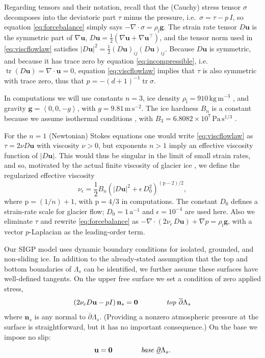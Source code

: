 \documentclass[letterpaper,final,12pt,reqno]{amsart}
\theoremstyle{claim}
\newcommand{\eps}{\epsilon}
\newcommand{\grad}{\nabla}
\newcommand{\Div}{\nabla\cdot}
\newcommand{\trace}{\operatorname{tr}}
\newcommand{\bg}{\mathbf{g}}
\newcommand{\bn}{\mathbf{n}}
\newcommand{\bu}{\mathbf{u}}
\newcommand{\bzero}{\bm{0}}
\newcommand{\rhoi}{\rho_{\text{i}}}
\newcommand{\pp}{{\text{p}}}
\numberwithin{equation}{section}
\numberwithin{figure}{section}
\numberwithin{table}{section}
\numberwithin{theorem}{section}
\begin{document}
Regarding tensors and their notation, recall that the (Cauchy) stress tensor $\sigma$ decomposes into the deviatoric part $\tau$ minus the pressure, i.e.~$\sigma = \tau - p\,I$, so equation \eqref{eq:forcebalance} simply says $-\Div \sigma = \rhoi \bg$.  The strain rate tensor $D\bu$ is the symmetric part of $\grad \bu$, $D\bu = \frac{1}{2} \left(\grad\bu + \grad\bu^\top\right)$, and the tensor norm used in \eqref{eq:viscflowlaw} satisfies $|D\bu|^2 = \frac{1}{2} (D\bu)_{ij} (D\bu)_{ij}$.  Because $D\bu$ is symmetric, and because it has trace zero by equation \eqref{eq:incompressible}, i.e.~$\trace(D\bu)=\nabla \cdot \bu = 0$, equation \eqref{eq:viscflowlaw} implies that $\tau$ is also symmetric with trace zero, thus that $p=-(d+1)^{-1} \trace \sigma$.

In computations we will use constants $n=3$, ice density $\rhoi=910 \,\text{kg}\,\text{m}^{-3}$ \cite{Huybrechtsetal1996}, and gravity $\bg=\left<0,0,-g\right>$, with $g=9.81\,\text{m}\,\text{s}^{-2}$.  The ice hardness $B_n$ is a constant because we assume isothermal conditions \cite{GreveBlatter2009}, with $B_3=6.8082\times 10^7\,\text{Pa}\,\text{s}^{1/3}$ \cite{Huybrechtsetal1996}.

For the $n=1$ (Newtonian) Stokes equations one would write \eqref{eq:viscflowlaw} as $\tau = 2\nu D\bu$ with viscosity $\nu>0$, but exponents $n>1$ imply an effective viscosity function of $|D\bu|$.  This would thus be singular in the limit of small strain rates, and so, motivated by the actual finite viscosity of glacier ice \cite{GreveBlatter2009}, we define the regularized effective viscosity
\begin{equation}
\nu_\eps = \frac{1}{2} B_n \left(|D\bu|^2 + \eps\, D_0^2\right)^{(\pp-2)/2}, \label{eq:regeffvisc}
\end{equation}
where $\pp=(1/n)+1$, with $\pp=4/3$ in computations.  The constant $D_0$ defines a strain-rate scale for glacier flow; $D_0 = 1 \,\text{a}^{-1}$ and $\eps = 10^{-4}$ are used here.  Also we eliminate $\tau$ and rewrite \eqref{eq:forcebalance} as $- \nabla \cdot \left(2 \nu_\eps\, D\bu\right) + \nabla p = \rhoi \mathbf{g}$, with a vector $p$-Laplacian as the leading-order term.

Our SIGP model uses dynamic boundary conditions for isolated, grounded, and non-sliding ice.  In addition to the already-stated assumption that the top and bottom boundaries of $\Lambda_s$ can be identified, we further assume these surfaces have well-defined tangents.  On the upper free surface we set a condition of zero applied stress,
\begin{equation}
\left(2 \nu_\eps D\bu - pI\right) \bn_s = \bzero  \qquad \qquad \text{\emph{top} } \overline{\partial} \Lambda_s \label{eq:topbc}
\end{equation}
where $\bn_s$ is any normal to $\overline{\partial} \Lambda_s$.  (Providing a nonzero atmospheric pressure at the surface is straightforward, but it has no important consequence.)  On the base we impose no slip:
\begin{equation}
\bu = \bzero  \qquad\qquad \text{\emph{base} } \underline{\partial} \Lambda_s. \label{eq:basebc}
\end{equation}
\end{document}
